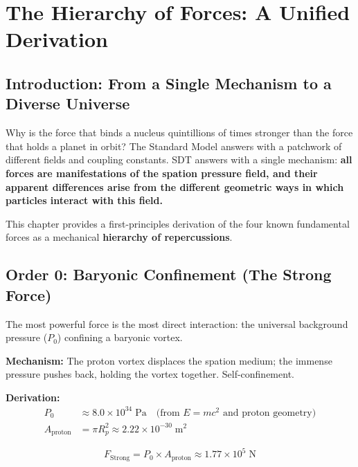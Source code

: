 \chapter{The Hierarchy of Forces: A Unified Derivation}

\author{James Tyndall}

\section{Introduction: From a Single Mechanism to a Diverse Universe}

Why is the force that binds a nucleus quintillions of times stronger than the force that holds a planet in orbit?  The Standard Model answers with a patchwork of different fields and coupling constants.  SDT answers with a single mechanism: \textbf{all forces are manifestations of the spation pressure field, and their apparent differences arise from the different geometric ways in which particles interact with this field.}

This chapter provides a first-principles derivation of the four known fundamental forces as a mechanical \textbf{hierarchy of repercussions}.


\section{Order 0: Baryonic Confinement (The Strong Force)}

The most powerful force is the most direct interaction: the universal background pressure ($P_0$) confining a baryonic vortex.

\textbf{Mechanism:} The proton vortex displaces the spation medium; the immense pressure pushes back, holding the vortex together.  Self-confinement.

\textbf{Derivation:}
\begin{align}
  P_0 &\approx 8.0 \times 10^{34}\;\text{Pa} \quad\text{(from $E = mc^2$ and proton geometry)} \\
  A_{\text{proton}} &= \pi R_p^2 \approx 2.22 \times 10^{-30}\;\text{m}^2
\end{align}

\begin{equation}\label{eq:F-strong}
  \boxed{F_{\text{Strong}} = P_0 \times A_{\text{proton}} \approx 1.77 \times 10^5\;\text{N}}
\end{equation}

